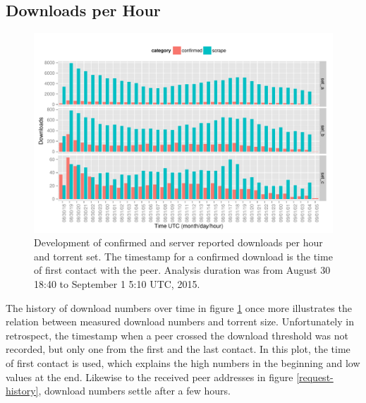 \documentclass[10pt, a4paper, twoside=false, headsepline]{scrbook}
\renewcommand{\_}{\origunderscore\allowbreak}
\newcommand{\range}{from August 30 18:40 to September 1 5:10 UTC, 2015}
\begin{document}
\subsection{Downloads per Hour}
\begin{figure}
\centering
\includegraphics[width=\textwidth]{../result/2015-08-30_20-combined_download_set}
\caption[Development of confirmed and reported downloads]{Development of confirmed and server reported downloads per hour and torrent set. The timestamp for a confirmed download is the time of first contact with the peer. Analysis duration was \range.}
\label{download-history}
\end{figure}

The history of download numbers over time in figure \ref{download-history} once more illustrates the relation between measured download numbers and torrent size. Unfortunately in retrospect, the timestamp when a peer crossed the download threshold was not recorded, but only one from the first and the last contact. In this plot, the time of first contact is used, which explains the high numbers in the beginning and low values at the end. Likewise to the received peer addresses in figure \ref{request-history}, download numbers settle after a few hours.
\end{document}
